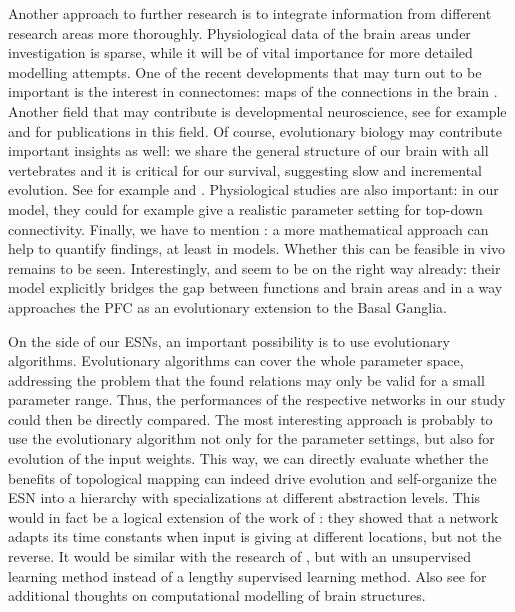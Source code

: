 \documentclass[10pt,a4paper]{report}
\begin{document}
Another approach to further research is to integrate information from different research areas more thoroughly. Physiological data of the brain areas under investigation is sparse, while it will be of vital importance for more detailed modelling attempts. One of the recent developments that may turn out to be important is the interest in connectomes: maps of the connections in the brain \citep{Sporns2011}. Another field that may contribute is developmental neuroscience, see for example \citet{Supekar2009} and \citet{Diamond2002} for publications in this field. Of course, evolutionary biology may contribute important insights as well: we share the general structure of our brain with all vertebrates and it is critical for our survival, suggesting slow and incremental evolution. See for example \citet{Jarvis2005} and \citet{Dunbar2007}. Physiological studies are also important: in our model, they could for example give a realistic parameter setting for top-down connectivity. Finally, we have to mention \citet{Tononi2003}: a more mathematical approach can help to quantify findings, at least in models. Whether this can be feasible in vivo remains to be seen. Interestingly, \citet{O'Reilly2006} and \citet{Hazy2007} seem to be on the right way already: their model explicitly bridges the gap between functions and brain areas and in a way approaches the PFC as an evolutionary extension to the Basal Ganglia. 

On the side of our ESNs, an important possibility is to use evolutionary algorithms. Evolutionary algorithms can cover the whole parameter space, addressing the problem that the found relations may only be valid for a small parameter range. Thus, the performances of the respective networks in our study could then be directly compared. The most interesting approach is probably to use the evolutionary algorithm not only for the parameter settings, but also for evolution of the input weights. This way, we can directly evaluate whether the benefits of topological mapping can indeed drive evolution and self-organize the ESN into a hierarchy with specializations at different abstraction levels. This would in fact be a logical extension of the work of \citet{Paine2005}: they showed that a network adapts its time constants when input is giving at different locations, but not the reverse. It would be similar with the research of \citet{Botvinick2007}, but with an unsupervised learning method instead of a lengthy supervised learning method. Also see \citet{Bullinaria2009} for additional thoughts on computational modelling of brain structures.
\end{document}

